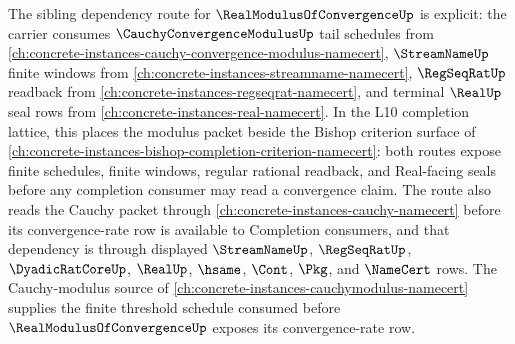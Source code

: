 The sibling dependency route for $\RealModulusOfConvergenceUp$ is explicit: the carrier consumes $\CauchyConvergenceModulusUp$ tail schedules from \autoref{ch:concrete-instances-cauchy-convergence-modulus-namecert}, $\StreamNameUp$ finite windows from \autoref{ch:concrete-instances-streamname-namecert}, $\RegSeqRatUp$ readback from \autoref{ch:concrete-instances-regseqrat-namecert}, and terminal $\RealUp$ seal rows from \autoref{ch:concrete-instances-real-namecert}. In the L10 completion lattice, this places the modulus packet beside the Bishop criterion surface of \autoref{ch:concrete-instances-bishop-completion-criterion-namecert}: both routes expose finite schedules, finite windows, regular rational readback, and Real-facing seals before any completion consumer may read a convergence claim. The route also reads the Cauchy packet through \autoref{ch:concrete-instances-cauchy-namecert} before its convergence-rate row is available to Completion consumers, and that dependency is through displayed $\StreamNameUp$, $\RegSeqRatUp$, $\DyadicRatCoreUp$, $\RealUp$, $\hsame$, $\Cont$, $\Pkg$, and $\NameCert$ rows. The Cauchy-modulus source of \autoref{ch:concrete-instances-cauchymodulus-namecert} supplies the finite threshold schedule consumed before $\RealModulusOfConvergenceUp$ exposes its convergence-rate row.
